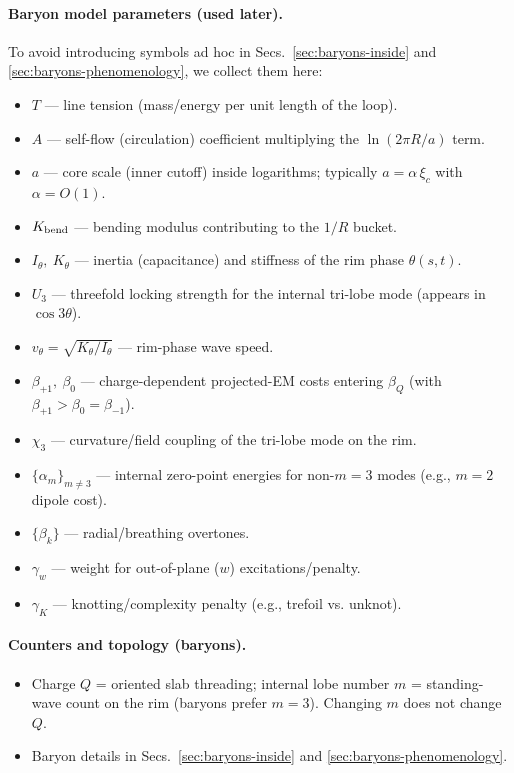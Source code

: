 \paragraph{Baryon model parameters (used later).}
To avoid introducing symbols ad hoc in Secs.~\ref{sec:baryons-inside} and \ref{sec:baryons-phenomenology}, we collect them here:
\begin{itemize}
  \item $T$ — line tension (mass/energy per unit length of the loop).
  \item $A$ — self-flow (circulation) coefficient multiplying the $\ln(2\pi R/a)$ term.
  \item $a$ — core scale (inner cutoff) inside logarithms; typically $a=\alpha\,\xi_c$ with $\alpha=O(1)$.
  \item $K_{\rm bend}$ — bending modulus contributing to the $1/R$ bucket.
  \item $I_\theta,\ K_\theta$ — inertia (capacitance) and stiffness of the rim phase $\theta(s,t)$.
  \item $U_3$ — threefold locking strength for the internal tri-lobe mode (appears in $\cos 3\theta$).
  \item $v_\theta=\sqrt{K_\theta/I_\theta}$ — rim-phase wave speed.
  \item $\beta_{+1},\ \beta_0$ — charge-dependent projected-EM costs entering $\beta_Q$ (with $\beta_{+1}>\beta_0=\beta_{-1}$).
  \item $\chi_3$ — curvature/field coupling of the tri-lobe mode on the rim.
  \item $\{\alpha_m\}_{m\neq 3}$ — internal zero-point energies for non-$m{=}3$ modes (e.g., $m{=}2$ dipole cost).
  \item $\{\beta_k\}$ — radial/breathing overtones.
  \item $\gamma_w$ — weight for out-of-plane ($w$) excitations/penalty.
  \item $\gamma_K$ — knotting/complexity penalty (e.g., trefoil vs. unknot).
\end{itemize}

\paragraph{Counters and topology (baryons).}
\begin{itemize}
  \item Charge $Q$ = oriented slab threading; internal lobe number $m$ = standing-wave count on the rim (baryons prefer $m{=}3$). Changing $m$ does not change $Q$.
  \item Baryon details in Secs.~\ref{sec:baryons-inside} and \ref{sec:baryons-phenomenology}.
\end{itemize}

